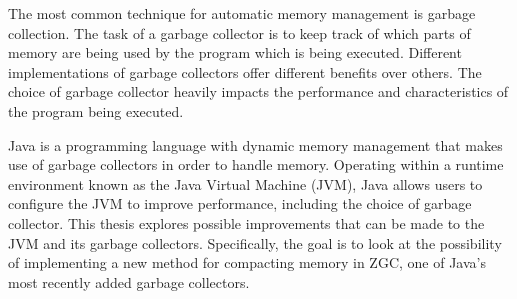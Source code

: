 


The most common technique for automatic memory management is garbage collection. The task of a garbage collector is to keep track of which parts of memory are being used by the program which is being executed. Different implementations of garbage collectors offer different benefits over others. The choice of garbage collector heavily impacts the performance and characteristics of the program being executed.

Java is a programming language with dynamic memory management that makes use of garbage collectors in order to handle memory. Operating within a runtime environment known as the Java Virtual Machine (JVM), Java allows users to configure the JVM to improve performance, including the choice of garbage collector. This thesis explores possible improvements that can be made to the JVM and its garbage collectors. Specifically, the goal is to look at the possibility of implementing a new method for compacting memory in ZGC, one of Java's most recently added garbage collectors.

